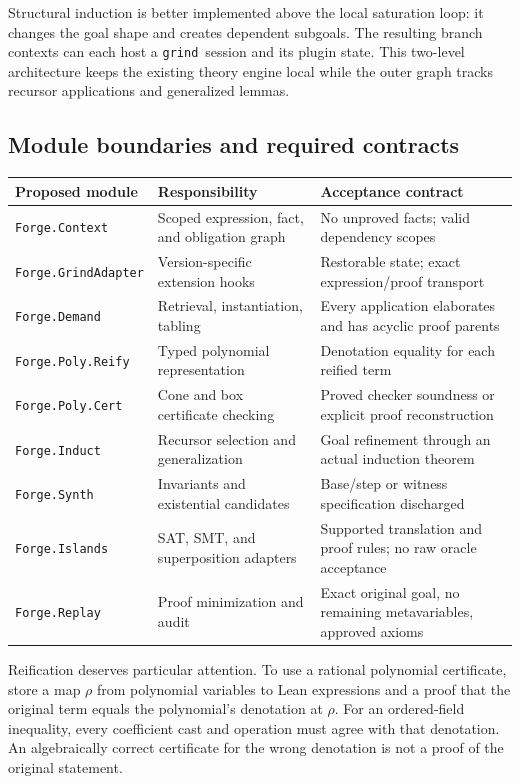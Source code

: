 \documentclass[11pt,a4paper]{article}
\newcommand{\grind}{\texttt{grind}}
\newcommand{\code}[1]{\texttt{\small #1}}
\begin{document}
Structural induction is better implemented above the local saturation loop:
it changes the goal shape and creates dependent subgoals. The resulting branch
contexts can each host a \grind\ session and its plugin state. This two-level
architecture keeps the existing theory engine local while the outer graph
tracks recursor applications and generalized lemmas.

\subsection{Module boundaries and required contracts}

\begin{center}
\begin{tabularx}{\textwidth}{@{}p{}YY@{}}
\toprule
Proposed module & Responsibility & Acceptance contract\\
\midrule
\code{Forge.Context} & Scoped expression, fact, and obligation graph & No unproved facts; valid dependency scopes\\
\code{Forge.GrindAdapter} & Version-specific extension hooks & Restorable state; exact expression/proof transport\\
\code{Forge.Demand} & Retrieval, instantiation, tabling & Every application elaborates and has acyclic proof parents\\
\code{Forge.Poly.Reify} & Typed polynomial representation & Denotation equality for each reified term\\
\code{Forge.Poly.Cert} & Cone and box certificate checking & Proved checker soundness or explicit proof reconstruction\\
\code{Forge.Induct} & Recursor selection and generalization & Goal refinement through an actual induction theorem\\
\code{Forge.Synth} & Invariants and existential candidates & Base/step or witness specification discharged\\
\code{Forge.Islands} & SAT, SMT, and superposition adapters & Supported translation and proof rules; no raw oracle acceptance\\
\code{Forge.Replay} & Proof minimization and audit & Exact original goal, no remaining metavariables, approved axioms\\
\bottomrule
\end{tabularx}
\end{center}

Reification deserves particular attention. To use a rational polynomial
certificate, store a map $\rho$ from polynomial variables to Lean expressions
and a proof that the original term equals the polynomial's denotation at
$\rho$. For an ordered-field inequality, every coefficient cast and operation
must agree with that denotation. An algebraically correct certificate for the
wrong denotation is not a proof of the original statement.
\end{document}
